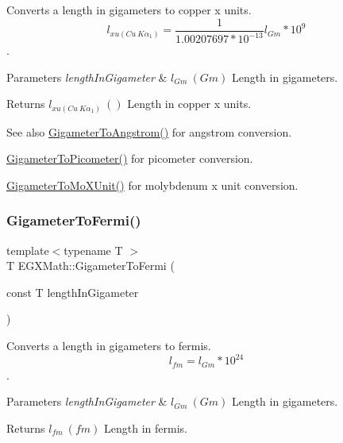 Converts a length in gigameters to copper x units. \[ l_{xu(Cu\ K\alpha_1)}= \frac{1}{1.00207697*10^{-13}} l_{Gm} * 10^{9}\]. 


\begin{DoxyParams}{Parameters}
{\em length\+In\+Gigameter} & $ l_{Gm}\ (Gm)$ Length in gigameters. \\
\hline
\end{DoxyParams}
\begin{DoxyReturn}{Returns}
$ l_{xu(Cu\ K\alpha_1)}\ ()$ Length in copper x units. 
\end{DoxyReturn}
\begin{DoxySeeAlso}{See also}
\mbox{\hyperlink{group___e_g_x_math-_conversions-_length_conversions-_gigameter-_non-_s_i_ga622e85e3f663039f3802b29d25655989}{Gigameter\+To\+Angstrom()}} for angstrom conversion. 

\mbox{\hyperlink{group___e_g_x_math-_conversions-_length_conversions-_gigameter-_s_i_gae9cea35a0ce747d02ec8b6cf7bfeaa7e}{Gigameter\+To\+Picometer()}} for picometer conversion. 

\mbox{\hyperlink{group___e_g_x_math-_conversions-_length_conversions-_gigameter-_non-_s_i_gac30ae06633de77b05d859ffb3cd2a577}{Gigameter\+To\+Mo\+X\+Unit()}} for molybdenum x unit conversion. 
\end{DoxySeeAlso}
\mbox{\label{group___e_g_x_math-_conversions-_length_conversions-_gigameter-_non-_s_i_gadf6d730ad6e47bc8be214f3ef59b48ca}} 
\subsubsection{\texorpdfstring{Gigameter\+To\+Fermi()}{GigameterToFermi()}}
{\footnotesize\ttfamily template$<$typename T $>$ \\
T E\+G\+X\+Math\+::\+Gigameter\+To\+Fermi (\begin{DoxyParamCaption}\item[{const T}]{length\+In\+Gigameter }\end{DoxyParamCaption})}



Converts a length in gigameters to fermis. \[ l_{fm}=l_{Gm} * 10^{24} \]. 


\begin{DoxyParams}{Parameters}
{\em length\+In\+Gigameter} & $ l_{Gm}\ (Gm)$ Length in gigameters. \\
\hline
\end{DoxyParams}
\begin{DoxyReturn}{Returns}
$ l_{fm}\ (fm)$ Length in fermis. 
\end{DoxyReturn}
\mbox{\label{group___e_g_x_math-_conversions-_length_conversions-_gigameter-_non-_s_i_ga90426d22455e96b1f61e1850c7b89f77}} 
